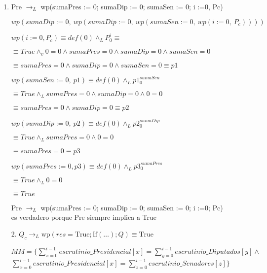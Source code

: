 \documentclass[10pt,a4paper]{article}
\begin{document}
\begin{enumerate}
    \item  Pre $\longrightarrow_{L}$ wp(sumaPres := 0; sumaDip := 0; sumaSen := 0; i :=0, Pc)
    \vspace{3mm} 

    $wp(sumaDip := 0, \: wp(sumaDip := 0, \: wp(sumaSen := 0, \: wp(i := 0, \: P_c))))$
    
    \quad $wp(i := 0, P_c) \equiv def(0) \land_L  P^i_0 \equiv$

    \quad\quad $\equiv True \land_v 0 = 0 \land sumaPres = 0 \land sumaDip = 0 \land sumaSen = 0 $

    \quad\quad $\equiv sumaPres = 0 \land sumaDip = 0 \land sumaSen = 0 \equiv p1$

    \quad $wp(sumaSen := 0, \: p1) \equiv def(0) \land_L p1^{sumaSen}_0$

    \quad\quad $\equiv True \land_L sumaPres = 0 \land sumaDip = 0 \land 0 = 0$

    \quad\quad $ \equiv sumaPres = 0 \land sumaDip = 0 \equiv p2$

    \quad $wp(sumaDip := 0, \: p2) \equiv def(0) \land_L p2^{sumaDip}_0$

    \quad\quad $\equiv True \land_L sumaPres = 0 \land 0 = 0$

    \quad\quad $\equiv sumaPres = 0 \equiv p3$

    \quad $wp(sumaPres := 0, p3) \equiv def(0) \land_L p3^{sumaPres}_0 $

    \quad\quad $\equiv True \land_L 0 = 0$  

    \quad\quad$ \equiv True $ 

\vspace{3mm} 
{Pre $\longrightarrow_{L}$ wp(sumaPres := 0; sumaDip := 0; sumaSen := 0; i :=0; Pc) \\ es verdadero porque Pre siempre implica a True }
\vspace{5mm} 

{2. $Q_c \longrightarrow_{L} \text{wp}(res = \text{True}; \text{If}(\ldots); Q) \equiv \text{True}$} %

\vspace{3mm} 
$ MM = \{ \sum\limits_{x=0}^{i - 1} escrutinio\_Presidencial[x] =\sum\limits_{y=0}^{i - 1} escrutinio\_Diputados[y] \land $ 
\\ $\sum\limits_{x=0}^{i - 1} escrutinio\_Presidencial[x] = \sum\limits_{z=0}^{i - 1} escrutinio\_Senadores[z] \} $ 


\end{enumerate}
\end{document}

